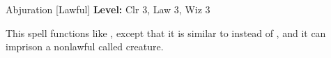 {Abjuration [Lawful]}
{
	\textbf{Level:}
	Clr 3, Law 3, Wiz 3\\
}
{
	This spell functions like , except that it is similar to  instead of , and it can imprison a nonlawful called creature.

}
